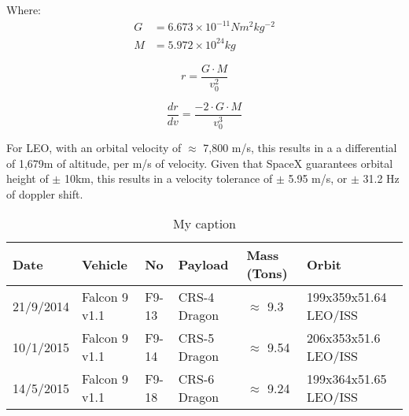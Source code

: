Where:
\begin{align*}
G &= 6.673 \times 10^{-11} N m^2 kg^{-2}\\
M &= 5.972 \times 10^{24} kg
\end{align*}

\begin{equation}
r = \frac{G \cdot M}{v_0^2}
\end{equation}

\begin{equation}
\frac{dr}{dv} = \frac{-2 \cdot G \cdot M}{v_0^3}
\end{equation}

For \ac{LEO}, with an orbital velocity of $\approx$ 7,800 m/s, this results in a a differential of 1,679m of altitude, per m/s of velocity. Given that SpaceX guarantees orbital height of $\pm$ 10km, this results in a velocity tolerance of $\pm$ 5.95 m/s, or $\pm$ 31.2 Hz of doppler shift.

\begin{table}[!htb]
\centering
\begin{tabular}{|l|l|l|l|l|l|}
\hline
\rowcolor[HTML]{C0C0C0} 
Date      & Vehicle       & No    & Payload      & Mass (Tons)         & Orbit                  \\ \hline
21/9/2014 & Falcon 9 v1.1 & F9-13 & CRS-4 Dragon & $\approx$ 9.3  & 199x359x51.64  LEO/ISS \\ \hline
\rowcolor[HTML]{EFEFEF} 
10/1/2015 & Falcon 9 v1.1 & F9-14 & CRS-5 Dragon & $\approx$ 9.54 & 206x353x51.6 LEO/ISS   \\ \hline
14/5/2015 & Falcon 9 v1.1 & F9-18 & CRS-6 Dragon & $\approx$ 9.24 & 199x364x51.65  LEO/ISS \\ \hline
\end{tabular}
\caption{My caption}
\label{FOOBAR}
\end{table}
\cite{Falcon9Stats}


